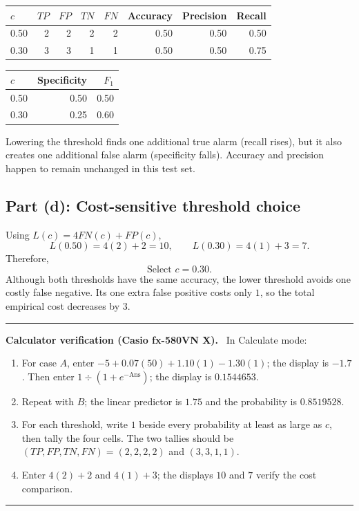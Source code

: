 \documentclass[11pt]{article}
\newcommand{\answer}[1]{\boxed{\displaystyle #1}}
\newenvironment{checkbox}
  {\par\medskip\noindent\begin{minipage}{\linewidth}
   \color{navy!90!black}\hrule\medskip
   \textbf{\sffamily Calculator verification (Casio fx-580VN X).}\ }
  {\medskip\hrule\end{minipage}\par\medskip}
\begin{document}
\begin{center}
\begin{tabular}{@{}lrrrrrrr@{}}
\toprule
\rowcolor{navy!10}
\(c\)&\(TP\)&\(FP\)&\(TN\)&\(FN\)&Accuracy&Precision&Recall\\
\midrule
0.50&2&2&2&2&0.50&0.50&0.50\\
0.30&3&3&1&1&0.50&0.50&0.75\\
\bottomrule
\end{tabular}

\vspace{0.5em}
\begin{tabular}{@{}lrr@{}}
\toprule
\rowcolor{navy!10}
\(c\)&Specificity&\(F_1\)\\
\midrule
0.50&0.50&0.50\\
0.30&0.25&0.60\\
\bottomrule
\end{tabular}
\end{center}

Lowering the threshold finds one additional true alarm (recall rises), but it
also creates one additional false alarm (specificity falls). Accuracy and
precision happen to remain unchanged in this test set.

\subsection{Part (d): Cost-sensitive threshold choice}

Using \(L(c)=4FN(c)+FP(c)\),
\[
L(0.50)=4(2)+2=\answer{10},
\qquad
L(0.30)=4(1)+3=\answer{7}.
\]
Therefore,
\[
\answer{\text{Select \(c=0.30\).}}
\]
Although both thresholds have the same accuracy, the lower threshold avoids
one costly false negative. Its one extra false positive costs only \(1\), so
the total empirical cost decreases by \(3\).

\begin{checkbox}
In Calculate mode:
\begin{enumerate}
\item For case \(A\), enter
\(-5+0.07(50)+1.10(1)-1.30(1)\); the display is \(-1.7\).
Then enter \(1\div(1+e^{-\text{Ans}})\); the display is \(0.1544653\).
\item Repeat with \(B\); the linear predictor is \(1.75\) and the probability
is \(0.8519528\).
\item For each threshold, write \(1\) beside every probability at least as
large as \(c\), then tally the four cells. The two tallies should be
\((TP,FP,TN,FN)=(2,2,2,2)\) and \((3,3,1,1)\).
\item Enter \(4(2)+2\) and \(4(1)+3\); the displays \(10\) and \(7\) verify
the cost comparison.
\end{enumerate}
\end{checkbox}
\end{document}
